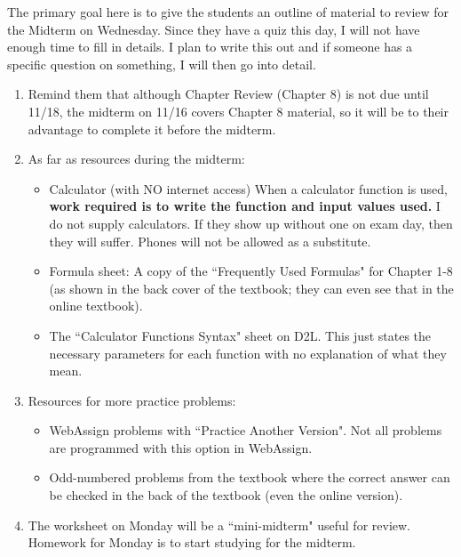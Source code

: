 \documentclass{article}
\begin{document}
The primary goal here is to give the students an outline of material to review for the Midterm on Wednesday. Since they have a quiz this day, I will not have enough time to fill in details. I plan to write this out and if someone has a specific question on something, I will then go into detail.

\begin{enumerate}

    \item Remind them that although Chapter Review (Chapter 8) is not due until 11/18, the midterm on 11/16 covers Chapter 8 material, so it will be to their advantage to complete it before the midterm.

    \item As far as resources during the midterm:
        
        \begin{itemize}
        
            \item Calculator (with NO internet access) When a calculator function is used, \textbf{work required is to write the function and input values used.} I do not supply calculators. If they show up without one on exam day, then they will suffer. Phones will not be allowed as a substitute.
            
            \item Formula sheet: A copy of the ``Frequently Used Formulas" for Chapter 1-8 (as shown in the back cover of the textbook; they can even see that in the online textbook).
            
            \item The ``Calculator Functions Syntax" sheet on D2L. This just states the necessary parameters for each function with no explanation of what they mean.
            
        \end{itemize}
        
    \item Resources for more practice problems:
        
        \begin{itemize}
        
            \item WebAssign problems with ``Practice Another Version".  Not all problems are programmed with this option in WebAssign.
            
            \item Odd-numbered problems from the textbook where the correct answer can be checked in the back of the textbook (even the online version).
            
        \end{itemize}
    
    \item The worksheet on Monday will be a ``mini-midterm" useful for review. Homework for Monday is to start studying for the midterm.
    
\end{enumerate}
\end{document}
